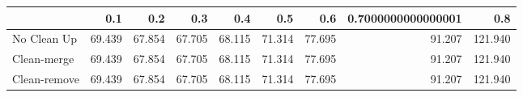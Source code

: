 \begin{tabular}{lrrrrrrrr}
\toprule
{} &    0.1 &    0.2 &    0.3 &    0.4 &    0.5 &    0.6 & 0.7000000000000001 &     0.8 \\
\midrule
No Clean Up  & 69.439 & 67.854 & 67.705 & 68.115 & 71.314 & 77.695 &             91.207 & 121.940 \\
Clean-merge  & 69.439 & 67.854 & 67.705 & 68.115 & 71.314 & 77.695 &             91.207 & 121.940 \\
Clean-remove & 69.439 & 67.854 & 67.705 & 68.115 & 71.314 & 77.695 &             91.207 & 121.940 \\
\bottomrule
\end{tabular}

